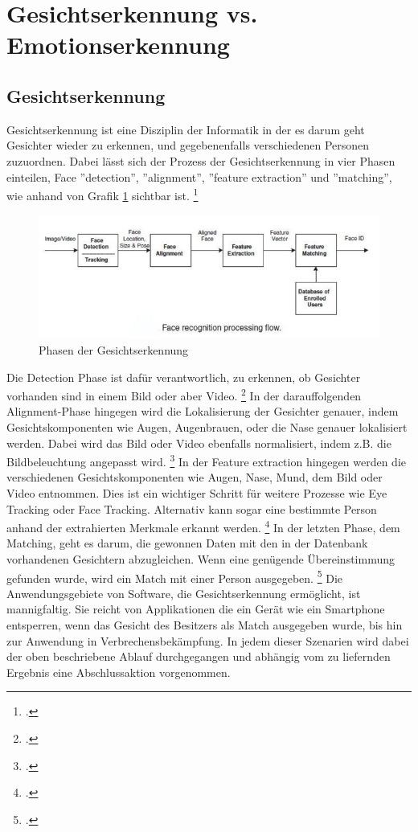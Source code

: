 \documentclass[12pt, a4paper]{report}
\newcommand*\setcaptioncitation[1]{\def\captioncitation{\textit{Quelle:}~#1}}
\let\captioncitation\relax
\begin{document}
\section{Gesichtserkennung vs. Emotionserkennung}

\subsection{Gesichtserkennung}
Gesichtserkennung ist eine Disziplin der Informatik in der es darum geht Gesichter wieder zu erkennen, und gegebenenfalls verschiedenen Personen zuzuordnen. Dabei lässt sich der Prozess der Gesichtserkennung in vier Phasen einteilen, Face ''detection'', ''alignment'', ''feature extraction'' und ''matching'', wie anhand von Grafik \ref{fig:Face Recognition} sichtbar ist.
\footcite[Vgl. ][2]{HandbookFaceRec}
\begin{figure}[h]
\includegraphics[width=\linewidth]{Bilder/FaceRecognition.png}
\setcaptioncitation{ https://alitarhini.files.wordpress.com/2010/12/untitled1.png}
\caption{ Phasen der Gesichtserkennung}
\label{fig:Face Recognition}
\end{figure}
Die Detection Phase ist dafür verantwortlich, zu erkennen, ob Gesichter vorhanden sind in einem Bild oder aber Video.
\footcite[Vgl. ][2]{HandbookFaceRec}
In der darauffolgenden Alignment-Phase hingegen wird die Lokalisierung der Gesichter genauer, indem Gesichtskomponenten wie Augen, Augenbrauen, oder die Nase genauer lokalisiert werden. Dabei wird das Bild oder Video ebenfalls normalisiert, indem z.B. die Bildbeleuchtung angepasst wird.
\footcite[Vgl. ][2]{HandbookFaceRec}
In der Feature extraction hingegen werden die verschiedenen Gesichtskomponenten wie Augen, Nase, Mund, dem Bild oder Video entnommen. Dies ist ein wichtiger Schritt für weitere Prozesse wie Eye Tracking oder Face Tracking. Alternativ kann sogar eine bestimmte Person anhand der extrahierten Merkmale erkannt werden.
\footcite[Vgl. ][Abstract]{IEEE}
In der letzten Phase, dem Matching, geht es darum, die gewonnen Daten mit den in der Datenbank vorhandenen Gesichtern abzugleichen. Wenn eine genügende Übereinstimmung gefunden wurde, wird ein Match mit einer Person ausgegeben.
\footcite[Vgl. ][3]{HandbookFaceRec}
Die Anwendungsgebiete von Software, die Gesichtserkennung ermöglicht, ist mannigfaltig. Sie reicht von Applikationen die ein Gerät wie ein Smartphone entsperren, wenn das Gesicht des Besitzers als Match ausgegeben wurde, bis hin zur Anwendung in Verbrechensbekämpfung. In jedem dieser Szenarien wird dabei der oben beschriebene Ablauf durchgegangen und abhängig vom zu liefernden Ergebnis eine Abschlussaktion vorgenommen.
\end{document}
